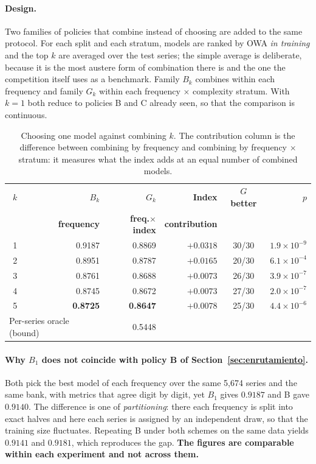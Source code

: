 \paragraph{Design.} Two families of policies that combine instead of choosing are added to
the same protocol. For each split and each stratum, models are ranked by OWA \emph{in
training} and the top $k$ are averaged over the test series; the simple average is
deliberate, because it is the most austere form of combination there is and the one the
competition itself uses as a benchmark. Family $B_k$ combines within each frequency and
family $G_k$ within each frequency $\times$ complexity stratum. With $k=1$ both reduce to
policies B and C already seen, so that the comparison is continuous.

\begin{table}[htbp]
\centering
\caption{Choosing one model against combining $k$. The contribution column is the
difference between combining by frequency and combining by frequency $\times$ stratum: it
measures what the index adds at an equal number of combined models.}
\label{tab:combinar}
\begin{tabular}{crrrcr}
\toprule
$k$ & \textbf{$B_k$} & \textbf{$G_k$} & \textbf{Index} &
\textbf{$G$ better} & \textbf{$p$} \\
  & \textbf{frequency} & \textbf{freq.$\times$index} & \textbf{contribution} & & \\
\midrule
1 & 0.9187 & 0.8869 & $+0.0318$ & 30/30 & $1.9\times10^{-9}$ \\
2 & 0.8951 & 0.8787 & $+0.0165$ & 20/30 & $6.1\times10^{-4}$ \\
3 & 0.8761 & 0.8688 & $+0.0073$ & 26/30 & $3.9\times10^{-7}$ \\
4 & 0.8745 & 0.8672 & $+0.0073$ & 27/30 & $2.0\times10^{-7}$ \\
5 & \textbf{0.8725} & \textbf{0.8647} & $+0.0078$ & 25/30 & $4.4\times10^{-6}$ \\
\midrule
\multicolumn{2}{l}{Per-series oracle (bound)} & 0.5448 & & & \\
\bottomrule
\end{tabular}
\end{table}

\paragraph{Why $B_1$ does not coincide with policy B of
Section~\ref{sec:enrutamiento}.} Both pick the best model of each frequency over the same
5{,}674 series and the same bank, with metrics that agree digit by digit, yet $B_1$ gives
$0.9187$ and B gave $0.9140$. The difference is one of \emph{partitioning}: there each
frequency is split into exact halves and here each series is assigned by an independent
draw, so that the training size fluctuates. Repeating B under both schemes on the same
data yields $0.9141$ and $0.9181$, which reproduces the gap. \textbf{The figures are
comparable within each experiment and not across them.}

